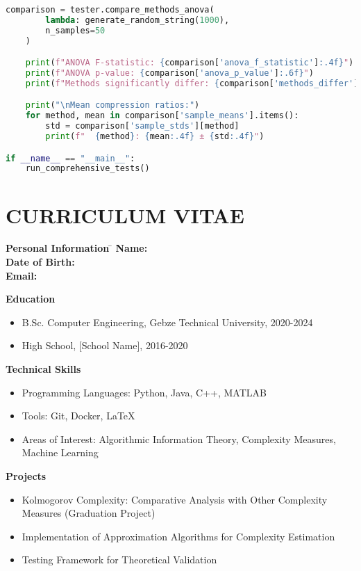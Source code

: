 \documentclass[12pt,a4paper]{report}
\begin{document}
\begin{lstlisting}[language=Python, caption=Validation Testing Protocol]
    comparison = tester.compare_methods_anova(
        lambda: generate_random_string(1000),
        n_samples=50
    )

    print(f"ANOVA F-statistic: {comparison['anova_f_statistic']:.4f}")
    print(f"ANOVA p-value: {comparison['anova_p_value']:.6f}")
    print(f"Methods significantly differ: {comparison['methods_differ']}")

    print("\nMean compression ratios:")
    for method, mean in comparison['sample_means'].items():
        std = comparison['sample_stds'][method]
        print(f"  {method}: {mean:.4f} ± {std:.4f}")

if __name__ == "__main__":
    run_comprehensive_tests()
\end{lstlisting}

\chapter*{CURRICULUM VITAE}

\begin{tabbing}
\textbf{Personal Information} \= \kill
\textbf{Name:} \\
\textbf{Date of Birth:} \> [Date]\\
\textbf{Email:} \> [Email]\\
\end{tabbing}

\textbf{Education}
\begin{itemize}
    \item B.Sc. Computer Engineering, Gebze Technical University, 2020-2024
    \item High School, [School Name], 2016-2020
\end{itemize}

\textbf{Technical Skills}
\begin{itemize}
    \item Programming Languages: Python, Java, C++, MATLAB
    \item Tools: Git, Docker, LaTeX
    \item Areas of Interest: Algorithmic Information Theory, Complexity Measures, Machine Learning
\end{itemize}

\textbf{Projects}
\begin{itemize}
    \item Kolmogorov Complexity: Comparative Analysis with Other Complexity Measures (Graduation Project)
    \item Implementation of Approximation Algorithms for Complexity Estimation
    \item Testing Framework for Theoretical Validation
\end{itemize}
\end{document}
